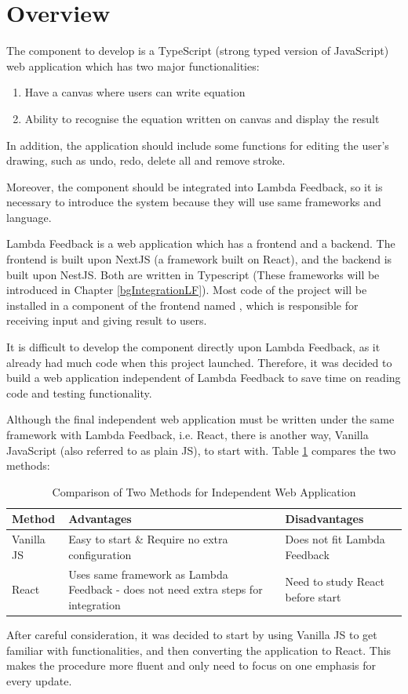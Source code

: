 \documentclass[12pt,twoside]{report}
\begin{document}
\section*{Overview}
\label{bgOverview}

The component to develop is a TypeScript (strong typed version of JavaScript) web application which has two major functionalities:
\begin{enumerate}
    \item Have a canvas where users can write equation
    \item Ability to recognise the equation written on canvas and display the result
\end{enumerate}

In addition, the application should include some functions for editing the user's drawing, such as undo, redo, delete all and remove stroke.

Moreover, the component should be integrated into Lambda Feedback, so it is necessary to introduce the system because they will use same frameworks and language.

Lambda Feedback is a web application which has a frontend and a backend.
The frontend is built upon NextJS (a framework built on React), and the backend is built upon NestJS. Both
are written in Typescript (These frameworks will be introduced in Chapter \ref{bgIntegrationLF}). Most code of the project will be installed in a component of the frontend named , which is responsible for receiving input and giving result to users.

It is difficult to develop the component directly upon Lambda Feedback, as it
already had much code when this project launched. Therefore, it was decided to
build a web application independent of Lambda Feedback to save time on reading
code and testing functionality.

Although the final independent web application must be written under the same
framework with Lambda Feedback, i.e. React, there is another way,
Vanilla JavaScript (also referred to as plain JS), to start with. Table \ref{MethodComparison} compares the two methods:
\begin{table}[H]
    \centering
    \caption{Comparison of Two Methods for Independent Web Application}
    \label{MethodComparison}
    \begin{tabular}{|m{}|m{}|m{}|}
        \hline
        \textbf{Method} & \textbf{Advantages} & \textbf{Disadvantages}\\
        \hline
        Vanilla JS & Easy to start \& Require no extra configuration&
        Does not fit Lambda Feedback\\
        \hline
        React & Uses same framework as Lambda Feedback - does not need extra steps for integration & Need to study React before start\\
        \hline
    \end{tabular}
\end{table}
After careful consideration, it was decided to start by using Vanilla JS to get familiar with functionalities, and then converting the application to React. This makes the procedure more fluent and only need to focus on one emphasis for every update.
\end{document}
